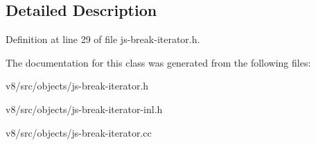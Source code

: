 \subsection{Detailed Description}


Definition at line 29 of file js-\/break-\/iterator.\+h.



The documentation for this class was generated from the following files\+:\begin{DoxyCompactItemize}
\item 
v8/src/objects/js-\/break-\/iterator.\+h\item 
v8/src/objects/js-\/break-\/iterator-\/inl.\+h\item 
v8/src/objects/js-\/break-\/iterator.\+cc\end{DoxyCompactItemize}
